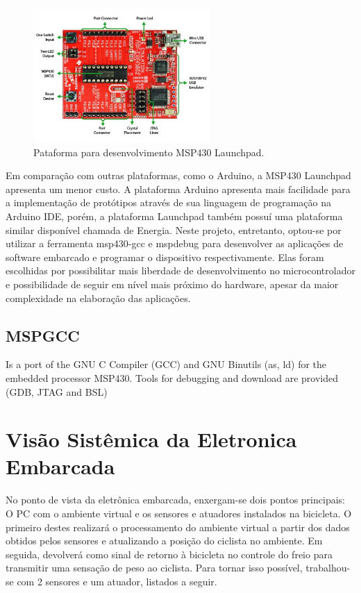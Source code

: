 \begin{figure}[h]
  \centering
  \includegraphics[width=0.6\textwidth]
      {figuras/Launchpad.jpg}
  \caption{Pataforma para desenvolvimento MSP430 Launchpad.}
  \label{Launchpad}
\end{figure}
Em comparação com outras plataformas, como o Arduino, a MSP430 Launchpad apresenta um menor custo. A plataforma Arduino apresenta mais facilidade para a implementação de protótipos através de sua linguagem de programação na Arduino IDE, porém, a plataforma Launchpad também possuí uma plataforma similar disponível chamada de Energia. Neste projeto, entretanto, optou-se por utilizar a ferramenta msp430-gcc e mspdebug para desenvolver as aplicações de software embarcado e programar o dispositivo respectivamente. Elas foram escolhidas por possibilitar mais liberdade de desenvolvimento no microcontrolador e possibilidade de seguir em nível mais próximo do hardware, apesar da maior complexidade na elaboração das aplicações.


\subsection{MSPGCC} %
\label{sub:mspgcc}

Is a port of the GNU C Compiler (GCC) and GNU Binutils (as, ld) for the embedded processor MSP430. Tools for debugging and download are provided (GDB, JTAG and BSL)


\section{Visão Sistêmica da Eletronica Embarcada} %
\label{sec:visao_sistemica}

No ponto de vista da eletrônica embarcada, enxergam-se dois pontos principais: O PC com o ambiente virtual e os sensores e atuadores instalados na bicicleta. O primeiro destes realizará o processamento do ambiente virtual a partir dos dados obtidos pelos sensores e atualizando a posição do ciclista no ambiente. Em seguida, devolverá como sinal de retorno à bicicleta no controle do freio para transmitir uma sensação de peso ao ciclista. Para tornar isso possível, trabalhou-se com 2 sensores e um atuador, listados a seguir.


